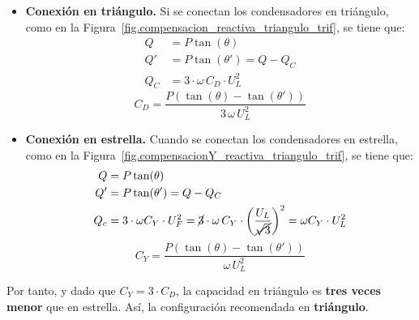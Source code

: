 		\begin{itemize}
		    \item \textbf{Conexión en triángulo.} Si se conectan los condensadores en triángulo, como en la Figura~\ref{fig.compensacion_reactiva_triangulo_trif}, se tiene que: 
		\begin{align*}
          Q &= P\tan(\theta)\\
          Q' &= P\tan(\theta') = Q - Q_C\\
          Q_C &= 3 \cdot \omega\, C_D \cdot U_L^2
        \end{align*}
        \begin{equation}
            \boxed{C_D = \frac{P(\tan (\theta) - \tan (\theta'))}{3\,\omega\, U_L^2}}
        \end{equation}
		    \item \textbf{Conexión en estrella.} Cuando se conectan los condensadores en estrella, como en la Figura~\ref{fig.compensacionY_reactiva_triangulo_trif}, se tiene que: 
		\begin{align*}
          Q &= P\tan(\theta)\\
          Q' &= P\tan(\theta') = Q - Q_C\\
          Q_c &= 3 \cdot \omega C_Y \cdot U_F^2 = \cancel{3} \cdot \omega \,C_Y \cdot \left(\dfrac{U_L}{\cancel{\sqrt{3}}}\right)^2=\omega C_Y \cdot U_L^2
        \end{align*}
        \begin{equation}
            \boxed{C_Y = \frac{P(\tan (\theta) - \tan (\theta'))}{\omega\, U_L^2}}
        \end{equation}
		\end{itemize}
		
		
		
		Por tanto, y dado que $C_Y = 3 \cdot C_D$, la capacidad en triángulo es \textbf{tres veces menor} que en estrella. Así, la configuración recomendada en \textbf{triángulo}.
		
